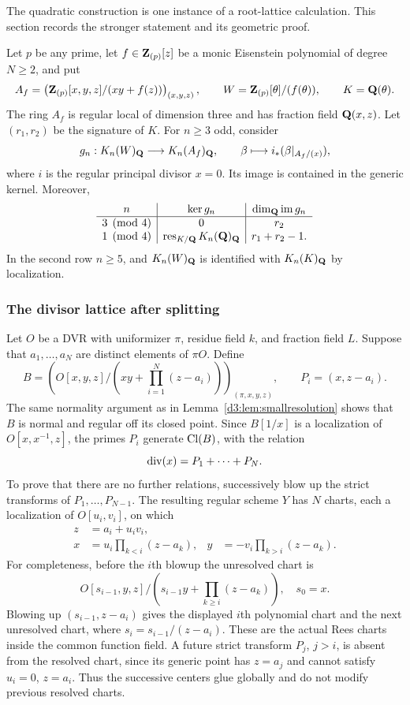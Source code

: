 The quadratic construction is one instance of a root-lattice calculation. This section records the stronger statement and its geometric proof.

\begin{theorem}\label{d3:thm:eisenstein}
Let $p$ be any prime, let $f\in\mathbf Z_{(p)}[z]$ be a monic Eisenstein polynomial of degree $N\geq2$, and put
\[
A_f=\left(\mathbf Z_{(p)}[x,y,z]/(xy+f(z))\right)_{(x,y,z)},\qquad
W=\mathbf Z_{(p)}[\theta]/(f(\theta)),\qquad K=\mathbf Q(\theta).
\]
The ring $A_f$ is regular local of dimension three and has fraction field $\mathbf Q(x,z)$. Let $(r_1,r_2)$ be the signature of $K$. For $n\geq3$ odd, consider
\[
g_n:K_n(W)_{\mathbf Q}\longrightarrow K_n(A_f)_{\mathbf Q},\qquad
\beta\longmapsto i_*(\beta|_{A_f/(x)}),
\]
where $i$ is the regular principal divisor $x=0$. Its image is contained in the generic kernel. Moreover,
\[
\begin{array}{c|c|c}
n&\ker g_n&\dim_{\mathbf Q}\operatorname{im}g_n\\ \hline
3\pmod4&0&r_2\\
1\pmod4&\operatorname{res}_{K/\mathbf Q}K_n(\mathbf Q)_{\mathbf Q}&r_1+r_2-1.
\end{array}
\]
In the second row $n\geq5$, and $K_n(W)_{\mathbf Q}$ is identified with $K_n(K)_{\mathbf Q}$ by localization.
\end{theorem}

\subsubsection{The divisor lattice after splitting}

Let $O$ be a DVR with uniformizer $\pi$, residue field $k$, and fraction field $L$. Suppose that $a_1,\ldots,a_N$ are distinct elements of $\pi O$. Define
\[
B=\left(O[x,y,z]/\left(xy+\prod_{i=1}^N(z-a_i)\right)\right)_{(\pi,x,y,z)},
\qquad P_i=(x,z-a_i).
\]
The same normality argument as in Lemma~\ref{d3:lem:smallresolution} shows that $B$ is normal and regular off its closed point. Since $B[1/x]$ is a localization of $O[x,x^{-1},z]$, the primes $P_i$ generate $\operatorname{Cl}(B)$, with the relation
\[
\operatorname{div}(x)=P_1+\cdots+P_N.
\]
To prove that there are no further relations, successively blow up the strict transforms of $P_1,\ldots,P_{N-1}$. The resulting regular scheme $Y$ has $N$ charts, each a localization of $O[u_i,v_i]$, on which
\begin{align*}
z&=a_i+u_i v_i,\\
x&=u_i\prod_{k<i}(z-a_k),&
y&=-v_i\prod_{k>i}(z-a_k).
\end{align*}
For completeness, before the $i$th blowup the unresolved chart is
\[
O[s_{i-1},y,z]/\left(s_{i-1}y+\prod_{k\geq i}(z-a_k)\right),
\quad s_0=x.
\]
Blowing up $(s_{i-1},z-a_i)$ gives the displayed $i$th polynomial chart and the next unresolved chart, where $s_i=s_{i-1}/(z-a_i)$. These are the actual Rees charts inside the common function field. A future strict transform $P_j$, $j>i$, is absent from the resolved chart, since its generic point has $z=a_j$ and cannot satisfy $u_i=0$, $z=a_i$. Thus the successive centers glue globally and do not modify previous resolved charts.


